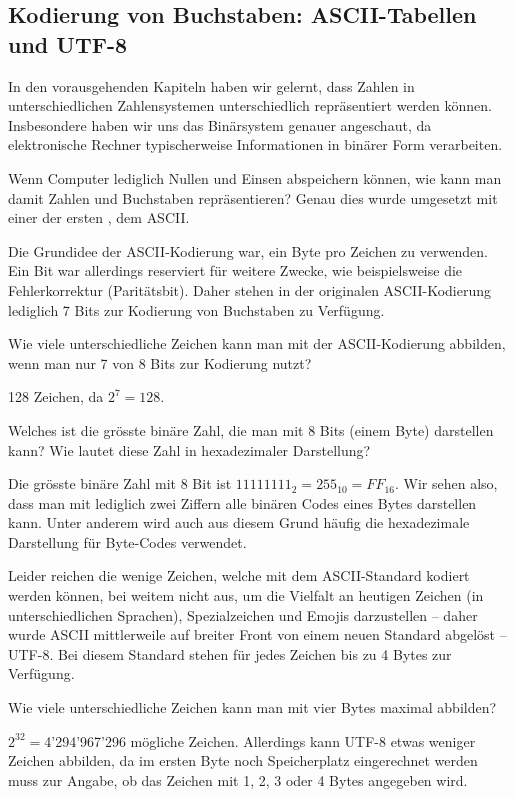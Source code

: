 \subsection{Kodierung von Buchstaben: ASCII-Tabellen und UTF-8}
In den vorausgehenden Kapiteln haben wir gelernt, dass Zahlen in unterschiedlichen Zahlensystemen unterschiedlich repräsentiert werden können. Insbesondere haben wir uns das Binärsystem genauer angeschaut, da elektronische Rechner typischerweise Informationen in binärer Form verarbeiten.

Wenn Computer lediglich Nullen und Einsen abspeichern können, wie kann man damit Zahlen und Buchstaben repräsentieren? Genau dies wurde umgesetzt mit einer der ersten , dem \gls{ASCII}.

Die Grundidee der \gls{ASCII}-Kodierung war, ein Byte pro Zeichen zu verwenden. Ein Bit war allerdings reserviert für weitere Zwecke, wie beispielsweise die Fehlerkorrektur (Paritätsbit). Daher stehen in der originalen ASCII-Kodierung lediglich 7 Bits zur Kodierung von Buchstaben zu Verfügung.

\begin{myexercise}
	Wie viele unterschiedliche Zeichen kann man mit der ASCII-Kodierung abbilden, wenn man nur 7 von 8 Bits zur Kodierung nutzt?
	\begin{myanswer}
		128 Zeichen, da $2^7=128$.
	\end{myanswer}
\end{myexercise}
\begin{myexercise}
	Welches ist die grösste binäre Zahl, die man mit 8 Bits (einem Byte) darstellen kann? Wie lautet diese Zahl in hexadezimaler Darstellung?
	\begin{myanswer}
		Die grösste binäre Zahl mit 8 Bit ist $11111111_2 = 255_{10} = FF_{16}$. Wir sehen also, dass man mit lediglich zwei Ziffern alle binären Codes eines Bytes darstellen kann. Unter anderem wird auch aus diesem Grund häufig die hexadezimale Darstellung für Byte-Codes verwendet.
	\end{myanswer}
\end{myexercise}

Leider reichen die wenige Zeichen, welche mit dem \gls{ASCII}-Standard kodiert werden können, bei weitem nicht aus, um die Vielfalt an heutigen Zeichen (in unterschiedlichen Sprachen), Spezialzeichen und Emojis darzustellen -- daher wurde \gls{ASCII} mittlerweile auf breiter Front von einem neuen Standard abgelöst -- \gls{UTF-8}. Bei diesem Standard stehen für jedes Zeichen bis zu 4 Bytes zur Verfügung.
\begin{myexercise}
	Wie viele unterschiedliche Zeichen kann man mit vier Bytes maximal abbilden?
	\begin{myanswer}
		$2^{32}=$4’294’967’296 mögliche Zeichen. Allerdings kann UTF-8 etwas weniger Zeichen abbilden, da im ersten Byte noch Speicherplatz eingerechnet werden muss zur Angabe, ob das Zeichen mit 1, 2, 3 oder 4 Bytes angegeben wird.
	\end{myanswer}
\end{myexercise}


